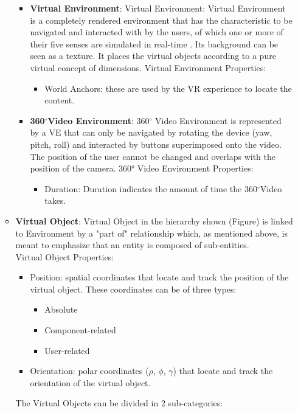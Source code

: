\begin{itemize}
\begin{itemize}
\begin{itemize}
\begin{itemize}
            \end{itemize}
            \item \textbf{Virtual Environment}: Virtual Environment: Virtual Environment  is a completely rendered environment that has the characteristic to be navigated and interacted with by the users, of which one or more of their five senses are simulated in real-time \cite{guttentag_virtual_2020}. Its background can be seen as a texture. It places the virtual objects  according to a pure virtual concept of dimensions.
            Virtual Environment Properties:
            \begin{itemize}
                \item World Anchors: these are used by the VR experience to locate the content.
            \end{itemize}
            \item \textbf{360$^{\circ}$Video Environment}: 360$^{\circ}$ Video Environment is represented by a VE that can only be navigated by rotating the device (yaw, pitch, roll) and interacted by buttons superimposed onto the video. The position of the user cannot be changed and overlaps with the position of the camera.
            360° Video Environment Properties:
            \begin{itemize}
                \item Duration: Duration indicates the amount of time the 360$^{\circ}$Video takes.
            \end{itemize}
        \end{itemize}
        
        \item \textbf{Virtual Object}: Virtual Object in the hierarchy shown (Figure) is linked to Environment by a "part of" relationship which, as mentioned above, is meant to emphasize that an entity is composed of sub-entities. \\
        Virtual Object Properties:
        \begin{itemize}
            \item Position: spatial coordinates that locate and track the position of the virtual object. These coordinates can be of three types:
            \begin{itemize}
                \item Absolute 
                \item Component-related 
                \item User-related 
            \end{itemize}
            \item Orientation: polar coordinates ($\rho$, $\phi$, $\gamma$) that locate and track the orientation of the virtual object.
        \end{itemize}
        The Virtual Objects can be divided in 2 sub-categories:
        
    \end{itemize}
\end{itemize}